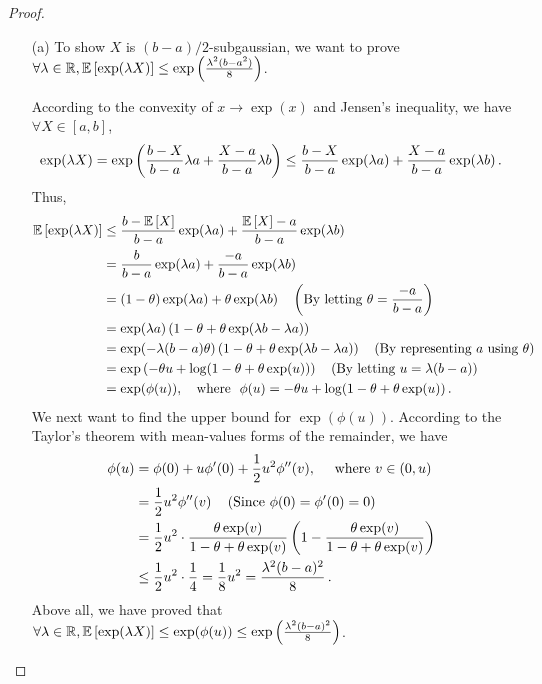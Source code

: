 \begin{proof}
\begin{enumerate}
	\item[(a)]To show $X$ is $(b-a)/2$-subgaussian, we want to prove $\forall \lambda \in \mathbb{R}, \mathbb{E} \left[\exp(\lambda X)\right] \le \exp\left( \frac{\lambda^2 (b-a^2)}{8} \right)$.

	According to the convexity of $x \to \exp(x)$ and Jensen's inequality, we have $\forall X \in [a,b]$,
	\begin{align*}
		\exp(\lambda X) = \exp\left( \frac{b-X}{b-a}\lambda a + \frac{X-a}{b-a}\lambda b \right) \le \frac{b-X}{b-a}\exp(\lambda a)+ \frac{X-a}{b-a}\exp(\lambda b)\,.
	\end{align*}
	Thus, 
	\begin{align*}
		\mathbb{E} \left[\exp(\lambda X)\right] &\le \frac{b-\mathbb{E} \left[X\right]}{b-a}\exp(\lambda a)+ \frac{\mathbb{E} \left[X\right]-a}{b-a}\exp(\lambda b) \\
		&= \frac{b}{b-a}\exp(\lambda a)+ \frac{-a}{b-a}\exp(\lambda b)\\
		&= (1-\theta)\exp(\lambda a)+\theta \exp(\lambda b) ~~~\left(\text{By letting $\theta = \frac{-a}{b-a}$}\right) \\
		&= \exp(\lambda a) \left(1-\theta+\theta \exp(\lambda b - \lambda a)\right) \\
		&= \exp(-\lambda(b-a)\theta) \left( 1-\theta+\theta \exp(\lambda b - \lambda a) \right) ~~~\left(\text{By representing $a$ using $\theta$}\right)\\
		&= \exp\left(-\theta u + \log(1-\theta+\theta\exp(u))\right) ~~~\left(\text{By letting $u=\lambda(b-a)$} \right) \\
		&= \exp(\phi(u)), ~~~\text{where}~~ \phi(u)=-\theta u + \log(1-\theta+\theta\exp(u))\,.
	\end{align*}
	We next want to find the upper bound for $\exp(\phi(u))$. According to the Taylor's theorem with mean-values forms of the remainder, we have 
	\begin{align*}
		\phi(u) &= \phi(0) + u\phi'(0) + \frac{1}{2}u^2 \phi''(v),~~~~\text{where}~v \in (0,u)\\
		&= \frac{1}{2}u^2 \phi''(v) ~~~\left(\text{Since $\phi(0) = \phi'(0) = 0$}\right)\\
		&= \frac{1}{2}u^2 \cdot \frac{\theta \exp(v)}{1-\theta+\theta \exp(v)}\left(1-\frac{\theta \exp(v)}{1-\theta+\theta \exp(v)}\right) \\
		&\le \frac{1}{2}u^2 \cdot \frac{1}{4} =\frac{1}{8}u^2 = \frac{\lambda^2 (b-a)^2}{8}\,.
	\end{align*}
	Above all, we have proved that $\forall \lambda \in \mathbb{R}, \mathbb{E} \left[\exp(\lambda X)\right] \le \exp(\phi(u)) \le \exp\left(\frac{\lambda^2 (b-a)^2}{8}\right)$. 



\end{enumerate}
\end{proof}
